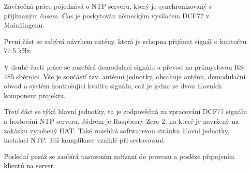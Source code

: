 Závěrečná práce pojednává o NTP serveru, který je synchronizovaný s přijímaným časem. Čas
je poskytován německým vysílačem DCF77 v Mainflingenu.

První část se zabývá návrhem antény, která je schopna přijímat signál o kmitočtu 77.5 kHz.

V druhé časti práce se rozebírá demodulaci signálu a převod na průmyslovou RS-485
sběrnici. Vše je součástí tzv. anténní jednotky, obsahuje anténu, demodulační obvod a systém kontrolující kvalitu
signálu, což je jedna ze dvou hlavních komponent projektu.

Třetí část se týká hlavní jednotky, ta je zodpovědná za zpracování DCF77 signálu a
hostování NTP serveru. Jádrem je Raspberry Zero 2, na které je navržený na zakázku
vyrobený HAT. Také rozebírá softwarevou stránku hlavní jednotky, instalací NTP. Též
komplikace vzniklé při sestavování.

Poslední pasáž se zaobírá nasazením zařízaní
do provozu a posléze připojením klientů na server.
